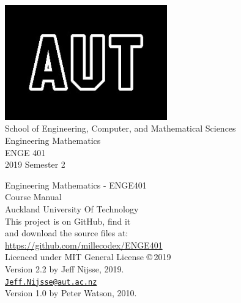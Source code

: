 \documentclass[a4paper,11pt,openany,oneside]{book}
\begin{document}
\frontmatter
\begin{titlepage}
\begin{center}

\includegraphics[width=7cm]{AUTlogo}\\
{\vspace{2cm}}
 {\Large School of Engineering, Computer, and Mathematical Sciences}
 \vspace{3cm}\\
 {\huge Engineering Mathematics}\\
 \vspace{1cm}
{\huge ENGE 401} \\
 \vspace{1cm}
{\huge 2019 Semester 2} \\
 \vfill
\end{center}
\end{titlepage}

\clearpage\thispagestyle{empty}
\vspace*{\fill}
Engineering Mathematics - ENGE401\\
Course Manual\\
Auckland University Of Technology\\

This project is on GitHub, find it \\
and download the source files at: \\
\url{https://github.com/millecodex/ENGE401} \\                            

Licenced under MIT General License \copyright \,2019 \\   

Version 2.2 by Jeff Nijsse, 2019.\\
\href{mailto:Jeff.Nijsse@aut.ac.nz}{\texttt{Jeff.Nijsse@aut.ac.nz}}\\
Version 1.0 by Peter Watson, 2010.


\clearpage
%
%
\tableofcontents
\mainmatter







\appendix


\backmatter
%
%
\end{document}
